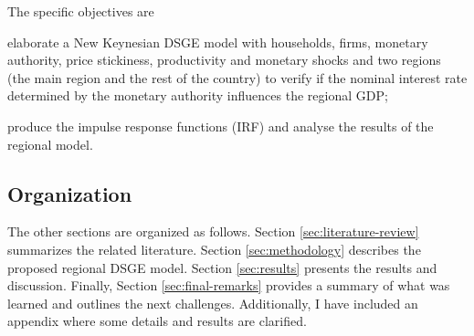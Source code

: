 \documentclass[../thesis.tex]{subfiles}
\begin{document}
The specific objectives are
\begin{enumerate*}[label=(\arabic*)]
	\item elaborate a New Keynesian DSGE model with households, firms, monetary authority, price stickiness, productivity and monetary shocks and two regions (the main region and the rest of the country) to verify if the nominal interest rate determined by the monetary authority influences the regional GDP;
	\item produce the impulse response functions (IRF) and analyse the results of the regional model.
\end{enumerate*}

\subsection*{Organization}

The other sections are organized as follows. Section \eqref{sec:literature-review} summarizes the related literature. Section \eqref{sec:methodology} describes the proposed regional DSGE model. Section \eqref{sec:results} presents the results and discussion. Finally, Section \eqref{sec:final-remarks} provides a summary of what was learned and outlines the next challenges. Additionally, I have included an appendix where some details and results are clarified.
\end{document}
